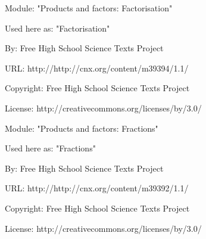       \par\vspace{9pt}\noindent\begin{minipage}{\textwidth}
      Module: "Products and factors: Factorisation" \par\nopagebreak\noindent
      Used here as: "Factorisation" \par\nopagebreak\noindent
        By: Free High School Science Texts Project\par\nopagebreak\noindent
      URL: http://http://cnx.org/content/m39394/1.1/\par\nopagebreak\noindent
      \par\nopagebreak\noindent
      Copyright: Free High School Science Texts Project\par\nopagebreak\noindent
      License:  http://creativecommons.org/licenses/by/3.0/\par\nopagebreak\noindent
      \par\end{minipage}
      \par\vspace{9pt}\noindent\begin{minipage}{\textwidth}
      Module: "Products and factors: Fractions" \par\nopagebreak\noindent
      Used here as: "Fractions" \par\nopagebreak\noindent
        By: Free High School Science Texts Project\par\nopagebreak\noindent
      URL: http://http://cnx.org/content/m39392/1.1/\par\nopagebreak\noindent
      \par\nopagebreak\noindent
      Copyright: Free High School Science Texts Project\par\nopagebreak\noindent
      License:  http://creativecommons.org/licenses/by/3.0/\par\nopagebreak\noindent
      \par\end{minipage}
